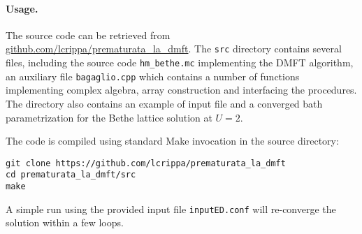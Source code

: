 \documentclass[edipack_sp.tex]{subfiles}
\begin{document}
\paragraph{Usage.}
The source code can be retrieved from
\href{https://github.com/lcrippa/prematurata_la_dmft}{github.com/lcrippa/prematurata\_la\_dmft}. 
The {\tt src} directory contains several files, including the source
code {\tt hm\_bethe.mc} implementing the DMFT algorithm, an auxiliary file {\tt bagaglio.cpp} which
contains a number of functions implementing complex algebra, array
construction and interfacing the \NAME procedures. The directory also
contains an example of input file and a converged bath parametrization
for the Bethe lattice solution at $U=2$.

The code is compiled using standard Make invocation in the source
directory:
\begin{lstlisting}[style=mybash,numbers=none]
git clone https://github.com/lcrippa/prematurata_la_dmft
cd prematurata_la_dmft/src
make
\end{lstlisting}
A simple run using the provided input file {\tt inputED.conf} will
re-converge the solution within a few loops. 

\ifSubfilesClassLoaded{
  
}{}
\end{document}
